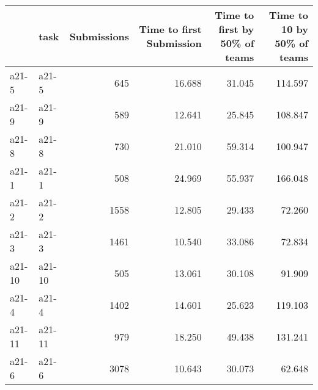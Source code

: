 \begin{tabular}{llrrrr}
\toprule
{} &    task &  Submissions &  Time to first Submission &  Time to first by 50\% of teams &  Time to 10 by 50\% of teams \\
\midrule
a21-5  &   a21-5 &          645 &                    16.688 &                         31.045 &                     114.597 \\
a21-9  &   a21-9 &          589 &                    12.641 &                         25.845 &                     108.847 \\
a21-8  &   a21-8 &          730 &                    21.010 &                         59.314 &                     100.947 \\
a21-1  &   a21-1 &          508 &                    24.969 &                         55.937 &                     166.048 \\
a21-2  &   a21-2 &         1558 &                    12.805 &                         29.433 &                      72.260 \\
a21-3  &   a21-3 &         1461 &                    10.540 &                         33.086 &                      72.834 \\
a21-10 &  a21-10 &          505 &                    13.061 &                         30.108 &                      91.909 \\
a21-4  &   a21-4 &         1402 &                    14.601 &                         25.623 &                     119.103 \\
a21-11 &  a21-11 &          979 &                    18.250 &                         49.438 &                     131.241 \\
a21-6  &   a21-6 &         3078 &                    10.643 &                         30.073 &                      62.648 \\
\bottomrule
\end{tabular}
